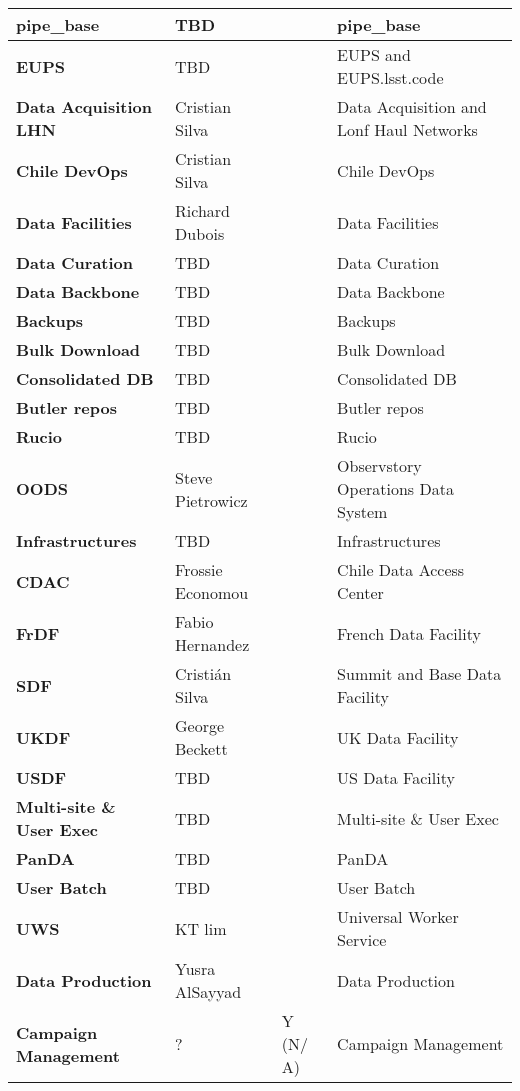 \begin{longtable} {
|p{}   |p{}|p{} |p{}|}
{\textbf{pipe\_base}} & TBD &  & pipe\_base \\ \hline
{\textbf{EUPS}} & TBD &  & EUPS and EUPS.lsst.code \\ \hline
{\textbf{Data Acquisition LHN}} & Cristian Silva &  & Data Acquisition and Lonf Haul Networks \\ \hline
{\textbf{Chile DevOps}} & Cristian Silva &  & Chile DevOps  \\ \hline
{\textbf{Data Facilities}} & Richard Dubois &  & Data Facilities \\ \hline
{\textbf{Data Curation}} & TBD &  & Data Curation \\ \hline
{\textbf{Data Backbone}} & TBD &  & Data Backbone \\ \hline
{\textbf{Backups}} & TBD &  & Backups \\ \hline
{\textbf{Bulk Download}} & TBD &  & Bulk Download \\ \hline
{\textbf{Consolidated DB}} & TBD &  & Consolidated DB \\ \hline
{\textbf{Butler repos}} & TBD &  & Butler repos \\ \hline
{\textbf{Rucio}} & TBD &  & Rucio \\ \hline
{\textbf{OODS}} & Steve Pietrowicz &  & Observstory Operations Data System \\ \hline
{\textbf{Infrastructures}} & TBD &  & Infrastructures \\ \hline
{\textbf{CDAC}} & Frossie Economou &  & Chile Data Access Center \\ \hline
{\textbf{FrDF}} & Fabio Hernandez &  & French Data Facility \\ \hline
{\textbf{SDF}} & Cristián Silva &  & Summit and Base Data Facility \\ \hline
{\textbf{UKDF}} & George Beckett &  & UK Data Facility \\ \hline
{\textbf{USDF}} & TBD &  & US Data Facility \\ \hline
{\textbf{Multi-site \&  User Exec}} & TBD &  & Multi-site \&  User Exec \\ \hline
{\textbf{PanDA}} & TBD &  & PanDA \\ \hline
{\textbf{User Batch}} & TBD &  & User Batch \\ \hline
{\textbf{UWS}} & KT lim &  & Universal Worker Service \\ \hline
{\textbf{Data Production}} & Yusra AlSayyad &  & Data Production \\ \hline
{\textbf{Campaign Management}} & ? & Y (N/ A) & Campaign Management \\ \hline

\end{longtable}
